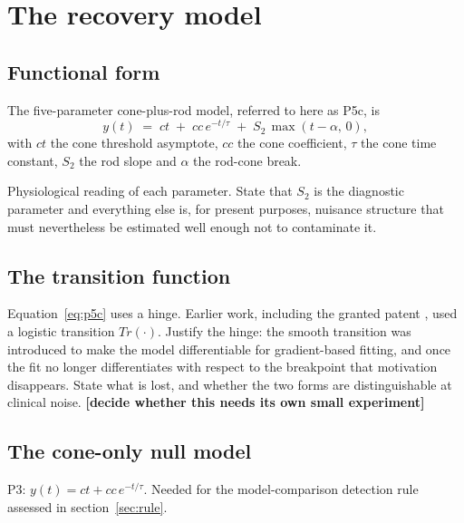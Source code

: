 \documentclass[11pt,a4paper]{article}
\newcommand{\FILL}[1]{\textbf{\textcolor{coneC}{[#1]}}}
\newcommand{\Sii}{S_2}
\begin{document}
\section{The recovery model}

\subsection{Functional form}
The five-parameter cone-plus-rod model, referred to here as P5c, is
\begin{equation}
\label{eq:p5c}
y(t) \;=\; ct \;+\; cc\,e^{-t/\tau} \;+\; \Sii\,\max(t-\alpha,\,0),
\end{equation}
with $ct$ the cone threshold asymptote, $cc$ the cone coefficient, $\tau$
the cone time constant, $\Sii$ the rod slope and $\alpha$ the rod-cone break.

\begin{towrite}
Physiological reading of each parameter. State that $\Sii$ is the diagnostic
parameter and everything else is, for present purposes, nuisance structure
that must nevertheless be estimated well enough not to contaminate it.
\end{towrite}

\subsection{The transition function}
\begin{towrite}
Equation~\eqref{eq:p5c} uses a hinge. Earlier work, including the granted
patent \citep{Kelly:2020aa}, used a logistic transition $Tr(\cdot)$.
Justify the hinge: the smooth transition was introduced to make the model
differentiable for gradient-based fitting, and once the fit no longer
differentiates with respect to the breakpoint that motivation disappears.
State what is lost, and whether the two forms are distinguishable at
clinical noise. \FILL{decide whether this needs its own small experiment}
\end{towrite}

\subsection{The cone-only null model}
\begin{towrite}
P3: $y(t) = ct + cc\,e^{-t/\tau}$. Needed for the model-comparison detection
rule assessed in section~\ref{sec:rule}.
\end{towrite}
\end{document}
